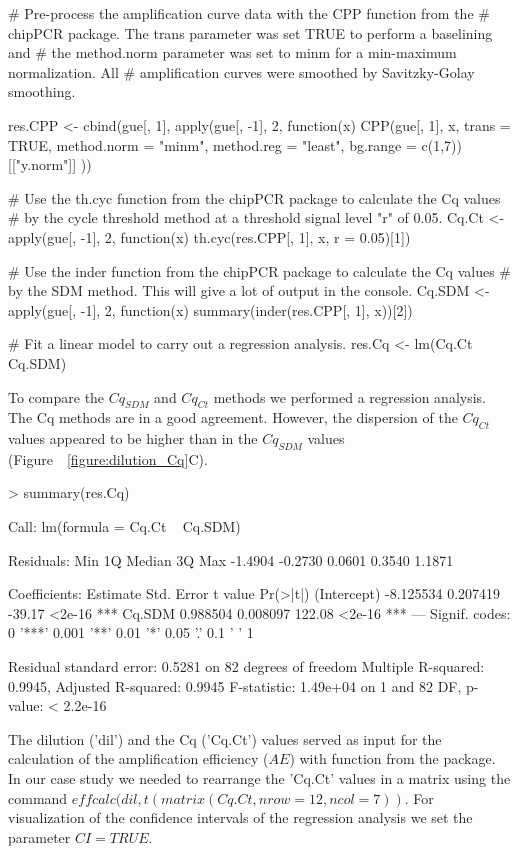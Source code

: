 \begin{example}
# Pre-process the amplification curve data with the CPP function from the 
# chipPCR package. The trans parameter was set TRUE to perform a baselining and 
# the method.norm parameter was set to minm for a min-maximum normalization. All
# amplification curves were smoothed by Savitzky-Golay smoothing.

res.CPP <- cbind(gue[, 1], apply(gue[, -1], 2, function(x) {
  CPP(gue[, 1], x, trans = TRUE, method.norm = "minm", method.reg = "least", 
      bg.range = c(1,7))[["y.norm"]]
}))

# Use the th.cyc function from the chipPCR package to calculate the Cq values
# by the cycle threshold method at a threshold signal level "r" of 0.05.
Cq.Ct <- apply(gue[, -1], 2, function(x) 
  th.cyc(res.CPP[, 1], x, r = 0.05)[1])

# Use the inder function from the chipPCR package to calculate the Cq values
# by the SDM method. This will give a lot of output in the console.
Cq.SDM <- apply(gue[, -1], 2, function(x)
  summary(inder(res.CPP[, 1], x))[2])

# Fit a linear model to carry out a regression analysis.
res.Cq <- lm(Cq.Ct ~ Cq.SDM)
\end{example}

To compare the $Cq_{SDM}$ and $Cq_{Ct}$ methods we performed a regression 
analysis. The Cq methods are in a good agreement. However, the dispersion of the 
$Cq_{Ct}$ values appeared to be higher than in the $Cq_{SDM}$ values 
(Figure~~\ref{figure:dilution_Cq}C).

\begin{example}
> summary(res.Cq)

Call:
lm(formula = Cq.Ct ~ Cq.SDM)

Residuals:
    Min      1Q  Median      3Q     Max 
-1.4904 -0.2730  0.0601  0.3540  1.1871 

Coefficients:
             Estimate Std. Error t value Pr(>|t|)    
(Intercept) -8.125534   0.207419  -39.17   <2e-16 ***
Cq.SDM       0.988504   0.008097  122.08   <2e-16 ***
---
Signif. codes:  0 '***' 0.001 '**' 0.01 '*' 0.05 '.' 0.1 ' ' 1

Residual standard error: 0.5281 on 82 degrees of freedom
Multiple R-squared:  0.9945,  Adjusted R-squared:  0.9945 
F-statistic: 1.49e+04 on 1 and 82 DF,  p-value: < 2.2e-16
\end{example}

The dilution ('dil') and the Cq ('Cq.Ct') values served as input for the 
calculation of the amplification efficiency ($AE$) with  function 
from the  package. In our case study we needed to rearrange the 
'Cq.Ct' values in a matrix using the command $effcalc(dil, t(matrix(Cq.Ct, 
nrow = 12, ncol = 7))$. For visualization of the confidence intervals of the 
regression analysis we set the parameter $CI = TRUE$.

